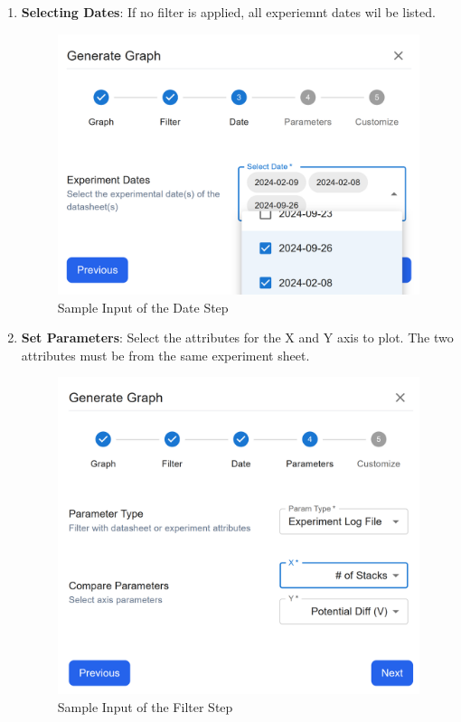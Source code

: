 \documentclass[12pt]{article}
\begin{document}
\begin{enumerate}
    \item \textbf{Selecting Dates}: \newline
    If no filter is applied, all experiemnt dates wil be listed. 
    \begin{figure}[H]
        \centering
        \includegraphics[scale=0.4]{Images/graph-dates.png}
        \caption{Sample Input of the Date Step}
        \label{fig:example}
    \end{figure}
    
    \item \textbf{Set Parameters}: \newline
    Select the attributes for the X and Y axis to plot. The two attributes must
    be from the same experiment sheet. 
    \begin{figure}[H]
        \centering
        \includegraphics[scale=0.4]{Images/graph-param.png}
        \caption{Sample Input of the Filter Step}
        \label{fig:example}
    \end{figure}
    

\end{enumerate}
\end{document}
